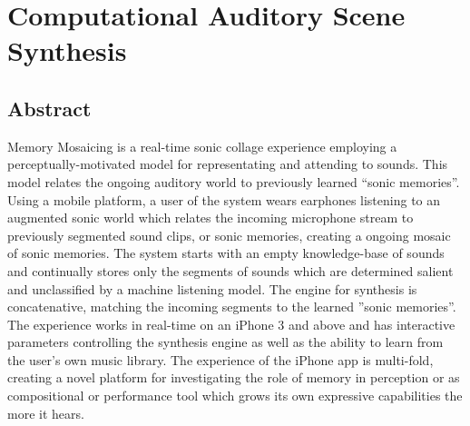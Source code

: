\documentclass[a4paper,10pt,final]{ThesisStyle}
\begin{document}







\chapter{Computational Auditory Scene Synthesis}
\label{ch:synthesis-audio}
\minitoc

\section{Abstract}

Memory Mosaicing is a real-time sonic collage experience employing a perceptually-motivated model for representating and attending to sounds. This model relates the ongoing auditory world to previously learned ``sonic memories''.  Using a mobile platform, a user of the system wears earphones listening to an augmented sonic world which relates the incoming microphone stream to previously segmented sound clips, or sonic memories, creating a ongoing mosaic of sonic memories.  The system starts with an empty knowledge-base of sounds and continually stores only the segments of sounds which are determined salient and unclassified by a machine listening model.  The engine for synthesis is concatenative, matching the incoming segments to the learned ''sonic memories''.  The experience works in real-time on an iPhone 3 and above and has interactive parameters controlling the synthesis engine as well as the ability to learn from the user's own music library.  The experience of the iPhone app is multi-fold, creating a novel platform for investigating the role of memory in perception or as compositional or performance tool which grows its own expressive capabilities the more it hears.
\end{document}

